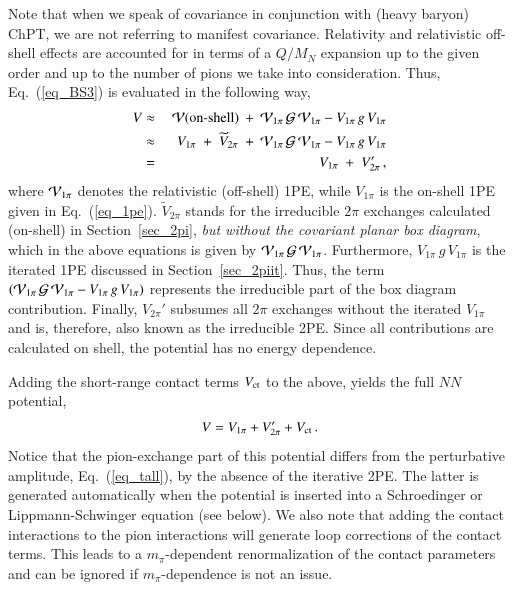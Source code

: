 \documentclass[sort&compress,preprint,3p]{elsarticle}
\begin{document}
Note that when we speak of covariance in conjunction with
(heavy baryon) ChPT, we are not referring to manifest
covariance. Relativity and relativistic off-shell
effects are accounted for in terms of
a $Q/M_N$ expansion up to the given order
and up to the number of pions we take into consideration.
Thus, Eq.~(\ref{eq_BS3}) is evaluated in the following way,
\begin{eqnarray}
V  & \approx &
 \:  {\cal V} (\mbox{\rm on-shell}) \: + \:
 {\cal V}_{1\pi}\,{\cal G}\,{\cal V}_{1\pi}-{V}_{1\pi}\,{g}\,{V}_{1\pi} 
\\
 & \approx & 
 \; V_{1\pi} \; + \; \widetilde{V}_{2\pi} \; + \:
 {\cal V}_{1\pi}\,{\cal G}\,{\cal V}_{1\pi}-{V}_{1\pi}\,{g}\,{V}_{1\pi} 
\\
 & = & 
 \; V_{1\pi} \; + \; V_{2\pi}'
\,,
\label{eq_BS4}
\end{eqnarray}
where
${\cal V}_{1\pi}$
denotes the relativistic (off-shell) 1PE, while
$V_{1\pi}$ is the on-shell 1PE given 
in Eq.~(\ref{eq_1pe}).
$\widetilde{V}_{2\pi}$  stands for the
irreducible $2\pi$ exchanges calculated (on-shell) in Section~\ref{sec_2pi},
{\it but without the covariant planar box diagram}, 
which in the above equations is given by
${\cal V}_{1\pi}\,{\cal G}\,{\cal V}_{1\pi}$.
Furthermore,
${V}_{1\pi}\,{g}\,{V}_{1\pi}$
is the iterated 1PE discussed in 
Section~\ref{sec_2piit}.
Thus, the term
$({\cal V}_{1\pi}\,{\cal G}\,{\cal V}
_{1\pi}-{V}_{1\pi}\,{g}\,{V}_{1\pi})$
represents the irreducible part of the
box diagram contribution. Finally,
$V_{2\pi}'$ subsumes all $2\pi$ exchanges without the iterated
$V_{1\pi}$ and is, therefore, also known as the irreducible 2PE.
Since all contributions are calculated on shell, the potential
has no energy dependence.

Adding the short-range contact terms $V_{\rm ct}$ to the above,
yields the full $NN$ potential, 
\begin{equation}
V = V_{1\pi} + V_{2\pi}' + V_{\rm ct} 
\,.
\label{eq_pot1}
\end{equation}
Notice that the pion-exchange part of this potential
differs from the perturbative amplitude, Eq.~(\ref{eq_tall}),
by the absence of the iterative 2PE. The latter is generated
automatically when the potential is inserted into a Schroedinger
or Lippmann-Schwinger equation (see below).
We also note that adding the contact interactions to the
pion interactions will generate loop corrections
of the contact terms. This leads to a $m_\pi$-dependent renormalization
of the contact parameters and can be ignored if $m_\pi$-dependence
is not an issue.
\end{document}
